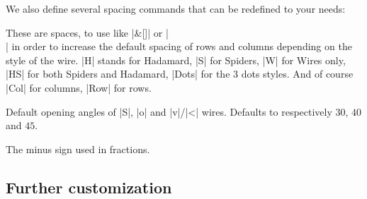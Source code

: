 \documentclass[a4paper]{ltxdoc}
\begin{document}
\noindent We also define several spacing commands that can be redefined to your needs:
\begin{pgfmanualentry}
  \extractcommand\zxHCol{}\@@
  \extractcommand\zxHRow{}\@@
  \extractcommand\zxHColFlat{}\@@
  \extractcommand\zxHRowFlat{}\@@
  \extractcommand\zxSCol{}\@@
  \extractcommand\zxSRow{}\@@
  \extractcommand\zxSColFlat{}\@@
  \extractcommand\zxSRowFlat{}\@@
  \extractcommand\zxHSCol{}\@@
  \extractcommand\zxHSRow{}\@@
  \extractcommand\zxHSColFlat{}\@@
  \extractcommand\zxHSRowFlat{}\@@
  \extractcommand\zxWCol{}\@@
  \extractcommand\zxWRow{}\@@
  \extractcommand\zxDotsCol{}\@@
  \extractcommand\zxDotsRow{}\@@
  \pgfmanualbody
  These are spaces, to use like |&[\zxHCol]| or |\\[\zxHRow]| in order to increase the default spacing of rows and columns depending on the style of the wire. |H| stands for Hadamard, |S| for Spiders, |W| for Wires only, |HS| for both Spiders and Hadamard, |Dots| for the 3 dots styles. And of course |Col| for columns, |Row| for rows.
\end{pgfmanualentry}


\begin{pgfmanualentry}
  \extractcommand\zxDefaultSoftAngleS{}\@@
  \extractcommand\zxDefaultSoftAngleO{}\@@
  \extractcommand\zxDefaultSoftAngleChevron{}\@@
  \pgfmanualbody
  Default opening angles of |S|, |o| and |v|/|<| wires. Defaults to respectively $30$, $40$ and $45$.
\end{pgfmanualentry}

\begin{command}{\zxMinus{}}
  The minus sign used in fractions.
\end{command}

\subsection{Further customization}
\end{document}

